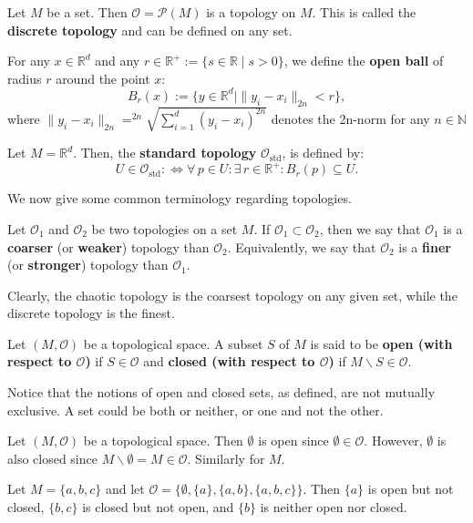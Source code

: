 \documentclass[root.tex]{subfiles}
\begin{document}
\begin{myex}
  Let $M$ be a set. Then $\mathcal{O}=\mathcal{P}(M)$ is a topology on $M$. This is called the \textbf{discrete topology} and can be defined on any set.
\end{myex}

\begin{mydef}
For any $x\in\mathbb{R}^d$ and any $r \in \mathbb{R}^+:=\{s\in\mathbb{R}\mid s>0\}$, we define the \textbf{open ball} of radius $r$ around the point $x$:
$$
B_r(x) := \bigl\{y\in \mathbb{R}^d \mid \|y_i-x_i\|_{2n} <r \bigr\},
$$
where $\|y_i-x_i\|_{2n}=^{2n}\sqrt{\sum_{i=1}^d (y_i-x_i)^{2n}}$ denotes the 2n-norm for any $n \in \mathbb{N}$ 
\end{mydef}

\begin{mydef}
  Let $M = \mathbb{R}^d$. Then, the \textbf{standard topology}   $\mathcal{O}_\mathrm{std}$, is defined by:
$$
U \in \mathcal{O}_\mathrm{std} :\Leftrightarrow \forall \, p \in U : \exists \, r \in \mathbb{R} ^+ : B_r(p) \subseteq U.
$$
\end{mydef}


We now give some common terminology regarding topologies.

\begin{mydef}
  Let $\mathcal{O}_1$ and $\mathcal{O}_2$ be two topologies on a set $M$. If $\mathcal{O}_1 \subset \mathcal{O}_2$, then we say that $\mathcal{O}_1$ is a \textbf{coarser} (or \textbf{weaker}) topology than $\mathcal{O}_2$. Equivalently, we say that $\mathcal{O}_2$ is a \textbf{finer} (or \textbf{stronger}) topology than $\mathcal{O}_1$.
\end{mydef}
Clearly, the chaotic topology is the coarsest topology on any given set, while the discrete topology is the finest.
\begin{mydef}
  Let $(M,\mathcal{O})$ be a topological space. A subset $S$ of $M$ is said to be \textbf{open (with respect to $\mathcal{O}$)} if $S \in \mathcal{O}$ and \textbf{closed (with respect to $\mathcal{O}$)} if $M\backslash S \in \mathcal{O}$. 
\end{mydef}
Notice that the notions of open and closed sets, as defined, are not mutually exclusive. A set could be both or neither, or one and not the other.
\begin{myex}
Let $(M,\mathcal{O})$ be a topological space. Then $\emptyset$ is open since $\emptyset \in \mathcal{O}$. However, $\emptyset$ is also closed since $M\backslash \emptyset = M \in \mathcal{O}$. Similarly for $M$.
\end{myex}
\begin{myex}
Let $M = \{a,b,c\}$ and let $\mathcal{O}=\{\emptyset,\{a\},\{a,b\},\{a,b,c\}\}$. Then $\{a\}$ is open but not closed, $\{b,c\}$ is closed but not open, and $\{b\}$ is neither open nor closed.
\end{myex}
\end{document}
